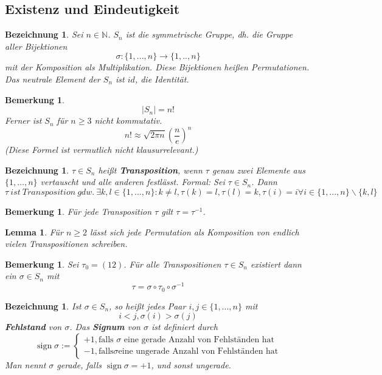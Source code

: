 \documentclass[12pt,a4paper]{article}
\theoremstyle{plain}
\newtheorem{Lemma}[Theorem]{Lemma}
\newtheorem{bez}[Theorem]{Bezeichnung}
\newtheorem{Bemerkung}[Theorem]{Bemerkung}
\numberwithin{equation}{section}
\begin{document}
\subsection{Existenz und Eindeutigkeit}
\begin{bez}
Sei $n\in\mathbb N$. \textbf{$S_n$} ist die symmetrische Gruppe, dh. die Gruppe aller Bijektionen
\[\sigma\colon \{1,...,n\}\rightarrow \{1,..,n\}\]
mit der Komposition als Multiplikation. Diese Bijektionen heißen Permutationen. Das neutrale Element der $S_n$ ist $id$, die Identität.
\end{bez}
\begin{Bemerkung}
\[\lvert S_n\rvert=n!\]
Ferner ist $S_n$ für $n\geq 3$ nicht kommutativ.
\[n!\approx \sqrt{2\pi n}\left(\frac n e\right)^n\]
(Diese Formel ist vermutlich nicht klausurrelevant.)
\end{Bemerkung}
\begin{bez}
$\tau\in S_n$ heißt \textbf{Transposition}, wenn $\tau$ genau zwei Elemente aus $\{1,\ldots ,n\}$ vertauscht und alle anderen festlässt. Formal: Sei $\tau\in S_n$. Dann
\[\tau\ ist\ Transposition\ gdw.\ \exists k,l\in\{1,...,n\}\colon k\neq l, \tau(k)=l,\tau(l)=k,\tau(i)=i\forall i\in\{1,...,n\}\backslash\{k,l\}\]
\end{bez}
\begin{Bemerkung}
Für jede Transposition $\tau$ gilt $\tau=\tau^{-1}$.
\end{Bemerkung}
\begin{Lemma}
Für $n\geq 2$ lässt sich jede Permutation als Komposition von endlich vielen Transpositionen schreiben.
\end{Lemma}
\begin{Bemerkung}
Sei $\tau_0=(12)$. Für alle Transpositionen $\tau\in S_n$ existiert dann ein $\sigma\in S_n$ mit
\[\tau=\sigma\circ\tau_0\circ\sigma^{-1}\]
\end{Bemerkung}
\begin{bez}
Ist $\sigma\in S_n$, so heißt jedes Paar $i,j\in\{1,...,n\}$ mit
\[i<j, \sigma(i)>\sigma(j)\]
\textbf{Fehlstand} von $\sigma$.
Das \textbf{Signum} von $\sigma$ ist definiert durch
\[\operatorname{sign}\sigma:=\left\{\begin{array}{ll} +1, \text{falls $\sigma$ eine gerade Anzahl von Fehlständen hat}\\ -1, \text{falls} \sigma \text{eine ungerade Anzahl von Fehlständen hat}\end{array}\right.\]
Man nennt $\sigma$ gerade, falls $\operatorname{sign}\sigma=+1$, und sonst ungerade.
\end{bez}
\end{document}
